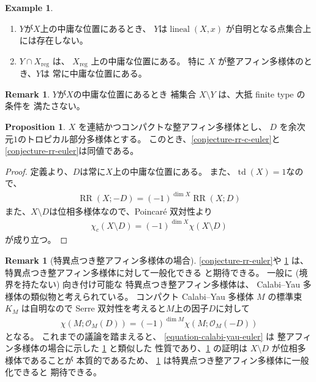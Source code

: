 \documentclass[a4paper,dvipdfmx,reqno,12pt]{amsart}
\theoremstyle{definition}
\newtheorem{example}[theorem]{Example}
\newtheorem{proposition}[theorem]{Proposition}
\newtheorem{remark}[theorem]{Remark}
\newcommand{\opn}[1]{\operatorname{#1}}
\numberwithin{equation}{section}
\begin{document}
\begin{example}
\begin{enumerate}
\item $Y$が$X$上の中庸な位置にあるとき、
$Y$は$\opn{lineal}(X,x)$
が自明となる点集合上には存在しない。
\item $Y\cap X_{\mathrm{reg}}$ は、
$X_{\mathrm{reg}}$ 上の中庸な位置にある。
特に $X$ が整アフィン多様体のとき、$Y$は
常に中庸な位置にある。
\end{enumerate}

\end{example}

\begin{remark}
$Y$が$X$の中庸な位置にあるとき
補集合 $X\setminus Y$ は、大抵 finite type の条件を
満たさない。
\end{remark}

\begin{proposition}
\label{proposition-divisor-poincare}
$X$ を連結かつコンパクトな整アフィン多様体とし、
$D$ を余次元$1$のトロピカル部分多様体とする。
このとき、\cref{conjecture-rr-c-euler}と
\cref{conjecture-rr-euler}は同値である。
\end{proposition}
\begin{proof}
定義より、$D$は常に$X$上の中庸な位置にある。
また、$\opn{td}(X)=1$なので、
\begin{align}
\opn{RR}(X;-D)=(-1)^{\dim X}\opn{RR}(X;D)
\end{align}
また、$X\setminus D$は位相多様体なので、Poincar\'e 双対性より
\begin{align}
\chi_c(X\setminus D)=(-1)^{\dim X}\chi(X\setminus D)
\end{align}
が成り立つ。
\end{proof}

\begin{remark}[{特異点つき整アフィン多様体の場合}]
\label{remark-iass}
\cref{conjecture-rr-euler}や
\cref{proposition-divisor-poincare}
は、特異点つき整アフィン多様体に対して一般化できる
と期待できる。
一般に (境界を持たない) 向き付け可能な
特異点つき整アフィン多様体は、
Calabi--Yau 多様体の類似物と考えられている。
コンパクト Calabi--Yau 多様体 $M$ の標準束
$K_M$ は自明なので
Serre 双対性を考えると$M$上の因子$D$に対して
\begin{align}
\label{equation-calabi-yau-euler}
\chi(M;\mathcal{O}_M(D))=(-1)^{\dim M}
\chi(M;\mathcal{O}_{M}(-D))
\end{align}
となる。
これまでの議論を踏まえると、
\cref{equation-calabi-yau-euler} は
整アフィン多様体の場合に示した
\cref{proposition-divisor-poincare} と類似した
性質であり、\cref{proposition-divisor-poincare}
の証明は $X\setminus D$ が位相多様体であることが
本質的であるため、
\cref{proposition-divisor-poincare}
は特異点つき整アフィン多様体に一般化できると
期待できる。
\end{remark}
\end{document}
